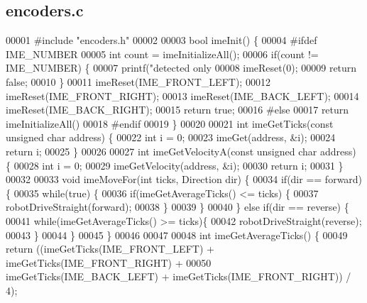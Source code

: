 \subsection{encoders.\+c}
\label{encoders_8c_source}

\begin{DoxyCode}
00001 \textcolor{preprocessor}{#include "encoders.h"}
00002 
00003 \textcolor{keywordtype}{bool} imeInit() \{
00004 \textcolor{preprocessor}{  #ifdef IME\_NUMBER}
00005     \textcolor{keywordtype}{int} count = imeInitializeAll();
00006     \textcolor{keywordflow}{if}(count != IME_NUMBER) \{
00007       printf(\textcolor{stringliteral}{"detected only %
00008       imeReset(0);
00009       \textcolor{keywordflow}{return} \textcolor{keyword}{false};
00010     \}
00011     imeReset(IME_FRONT_LEFT);
00012     imeReset(IME_FRONT_RIGHT);
00013     imeReset(IME_BACK_LEFT);
00014     imeReset(IME_BACK_RIGHT);
00015     \textcolor{keywordflow}{return} \textcolor{keyword}{true};
00016 \textcolor{preprocessor}{  #else}
00017     \textcolor{keywordflow}{return} imeInitializeAll()
00018   \textcolor{preprocessor}{#endif}
00019 \}
00020 
00021 \textcolor{keywordtype}{int} imeGetTicks(\textcolor{keyword}{const} \textcolor{keywordtype}{unsigned} \textcolor{keywordtype}{char} address) \{
00022   \textcolor{keywordtype}{int} i = 0;
00023   imeGet(address, &i);
00024   \textcolor{keywordflow}{return} i;
00025 \}
00026 
00027 \textcolor{keywordtype}{int} imeGetVelocityA(\textcolor{keyword}{const} \textcolor{keywordtype}{unsigned} \textcolor{keywordtype}{char} address) \{
00028   \textcolor{keywordtype}{int} i = 0;
00029   imeGetVelocity(address, &i);
00030   \textcolor{keywordflow}{return} i;
00031 \}
00032 
00033 \textcolor{keywordtype}{void} imeMoveFor(\textcolor{keywordtype}{int} ticks, Direction dir) \{
00034   \textcolor{keywordflow}{if}(dir == forward) \{
00035     \textcolor{keywordflow}{while}(\textcolor{keyword}{true}) \{
00036       \textcolor{keywordflow}{if}(imeGetAverageTicks() <= ticks) \{
00037         robotDriveStraight(forward);
00038       \}
00039   \}
00040 \} \textcolor{keywordflow}{else} \textcolor{keywordflow}{if}(dir == reverse) \{
00041     \textcolor{keywordflow}{while}(imeGetAverageTicks() >= ticks)\{
00042       robotDriveStraight(reverse);
00043     \}
00044   \}
00045 \}
00046 
00047 
00048 \textcolor{keywordtype}{int} imeGetAverageTicks() \{
00049   \textcolor{keywordflow}{return} ((imeGetTicks(IME_FRONT_LEFT) + imeGetTicks(IME_FRONT_RIGHT) +
00050     imeGetTicks(IME_BACK_LEFT) + imeGetTicks(IME_FRONT_RIGHT)) / 4);
}
\end{DoxyCode}

